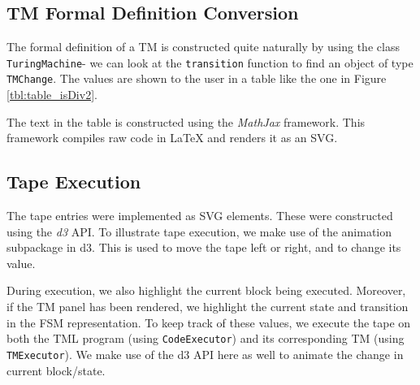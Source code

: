 \subsection{TM Formal Definition Conversion}
The formal definition of a TM is constructed quite naturally by using the class \texttt{TuringMachine}- we can look at the \texttt{transition} function to find an object of type \texttt{TMChange}. The values are shown to the user in a table like the one in Figure \ref{tbl:table_isDiv2}.

The text in the table is constructed using the \emph{MathJax} framework. This framework compiles raw code in LaTeX and renders it as an SVG.

\subsection{Tape Execution}

The tape entries were implemented as SVG elements. These were constructed using the \emph{d3} API. To illustrate tape execution, we make use of the animation subpackage in d3. This is used to move the tape left or right, and to change its value. 

During execution, we also highlight the current block being executed. Moreover, if the TM panel has been rendered, we highlight the current state and transition in the FSM representation. To keep track of these values, we execute the tape on both the TML program (using \texttt{CodeExecutor}) and its corresponding TM (using \texttt{TMExecutor}). We make use of the d3 API here as well to animate the change in current block/state.

